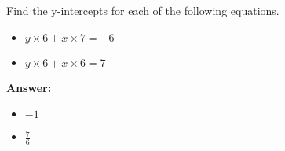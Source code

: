  Find the y-intercepts for each of the following equations. \begin{itemize}\item \( y \times 6 + x \times 7 = -6 \)\item \( y \times 6 + x \times 6 = 7 \)\end{itemize}

        \textbf{Answer:} \begin{itemize}\item \( -1 \)\item \( \frac{7}{6} \)\end{itemize}
